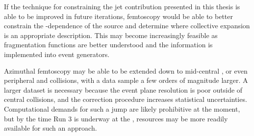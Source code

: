 If the technique for constraining the jet contribution presented in this thesis is able to be improved in future iterations, femtoscopy would be able to better constrain the \kt-dependence of the source and determine where collective expansion is an appropriate description.
This may become increasingly feasible as fragmentation functions are better understood and the information is implemented into \mc event generators.

Azimuthal femtoscopy may be able to be extended down to mid-central \pPb, or even peripheral \pPb and \pp collisions, with a data sample a few orders of magnitude larger.
A larger dataset is necessary because the event plane resolution is poor outside of central \pPb collisions, and the correction procedure increases statistical uncertainties.
Computational demands for such a jump are likely prohibitive at the moment, but by the time Run 3 is underway at the \lhc, resources may be more readily available for such an approach.
